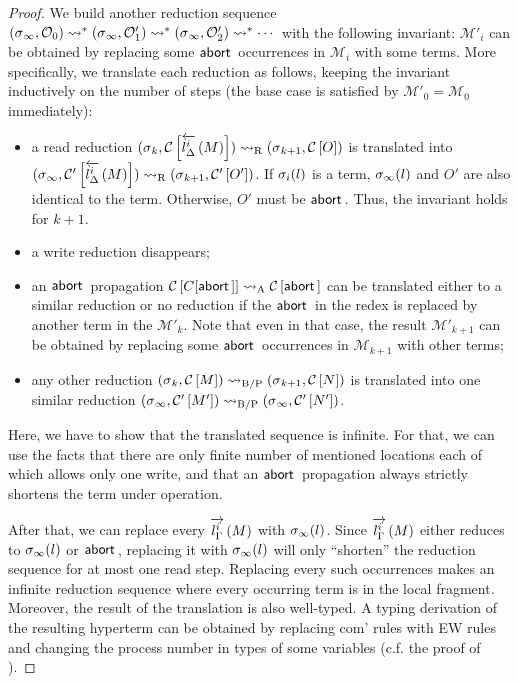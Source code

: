 {\begin{proof}
We build another reduction sequence
$
\conf{_\infty}{\hypert_0}
\reduce^\ast
\conf{_\infty}{\hypert'_1}
\reduce^\ast
\conf{_\infty}{\hypert'_2}
\reduce^\ast\cdots
$
with the following invariant:
$\mathcal M'_i$ can be obtained by replacing some $\abort$ occurrences
in $\mathcal M_i$ with some terms.
More specifically, we translate each reduction as follows, keeping the
invariant inductively on the number of steps
(the base case is satisfied by $\mathcal M'_0 = \mathcal M_0$ immediately):
\begin{itemize}
 \item a read reduction $\conf{_k}{\hypc{}{\rtol i l\Delta M}}
       \rreduce
       \conf{_{k+1}}{\hypc{}{O}}$ is translated into
       $\conf{_\infty}{\hypc'{\rtol i l\Delta M}} \rreduce
       \conf{_{k+1}}{\hypc'{O'}}$.
       If $\lstore_i(l)$ is a term,
       $\lstore_\infty(l)$ and $O'$ are also identical to the term.
       Otherwise, $O'$ must be $\abort$.
       Thus, the invariant
       holds for $k+1$.
 \item a write reduction disappears;
 \item an $\abort$ propagation
       $\hypc{}{C[\abort]} \areduce \hypc{}{\abort}$ can be translated
       either to a similar reduction or no reduction if the $\abort$ in
       the redex is replaced by another term in the $\mathcal{M'}_k$.
       Note that even in that case, the result $\mathcal{M'}_{k+1}$ can
       be obtained by replacing some $\abort$ occurrences in
       $\mathcal{M}_{k+1}$ with other terms;
 \item any other reduction $\conf{_k}{\hypc{}{M}} \bpreduce
       \conf{_{k+1}}{\hypc{}{N}}$
       is translated into one similar reduction
       $\conf{_\infty}{\hypc{'}{M'}}\bpreduce
        \conf{_\infty}{\hypc{'}{N'}}$.
\end{itemize}
Here, we have to show that the translated sequence is infinite.
 For that, we can use the facts that
 there are only finite
number of mentioned locations each of which allows only one write, and that
an $\abort$ propagation always
strictly shortens the term under operation.

 After that, we can replace
 every ${\ltor i l\Gamma M}$ with
 $\lstore_\infty(l)$.
 Since $\ltor i l\Gamma M$ either reduces to $\lstore_\infty(l)$ or $\abort$,
 replacing it with $\lstore_\infty(l)$ will only ``shorten'' the reduction
 sequence for at most one read step.
 Replacing every such occurrences
 makes an infinite reduction sequence where every occurring term is
 in the local fragment.
 Moreover,
 the result of the translation is also well-typed.
 A typing derivation of the resulting hyperterm can be obtained by
 replacing com' rules with EW rules and changing the process number in
 types of some variables (c.f. the proof of ).


\end{proof}}
